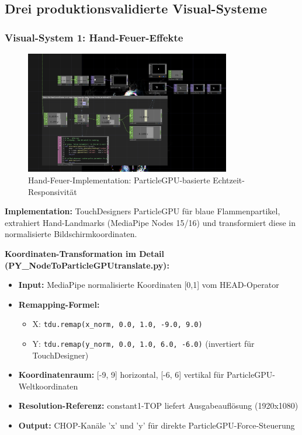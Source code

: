 \newpage

\subsection{Drei produktionsvalidierte Visual-Systeme}

\subsubsection{Visual-System 1: Hand-Feuer-Effekte}

\begin{figure}[h]
    \centering
    \includegraphics[width=0.8\textwidth]{images/docupictures/NoisyBlob_HEAD_to_ParticleGPU_Translate.png}
    \caption{Hand-Feuer-Implementation: ParticleGPU-basierte Echtzeit-Responsivität}
    \label{fig:hand_fire_system}
\end{figure}

\textbf{Implementation:} TouchDesigners ParticleGPU für blaue Flammenpartikel, extrahiert Hand-Landmarks (MediaPipe Nodes 15/16) und transformiert diese in normalisierte Bildschirmkoordinaten.

\textbf{Koordinaten-Transformation im Detail (PY\_NodeToParticleGPUtranslate.py):}
\begin{itemize}
    \item \textbf{Input:} MediaPipe normalisierte Koordinaten [0,1] vom HEAD-Operator
    \item \textbf{Remapping-Formel:} 
    \begin{itemize}
        \item X: \texttt{tdu.remap(x\_norm, 0.0, 1.0, -9.0, 9.0)}
        \item Y: \texttt{tdu.remap(y\_norm, 0.0, 1.0, 6.0, -6.0)} (invertiert für TouchDesigner)
    \end{itemize}
    \item \textbf{Koordinatenraum:} [-9, 9] horizontal, [-6, 6] vertikal für ParticleGPU-Weltkoordinaten
    \item \textbf{Resolution-Referenz:} constant1-TOP liefert Ausgabeauflösung (1920x1080)
    \item \textbf{Output:} CHOP-Kanäle 'x' und 'y' für direkte ParticleGPU-Force-Steuerung
\end{itemize}

